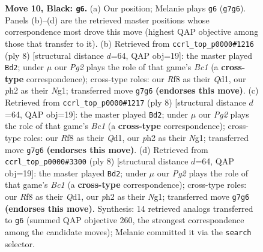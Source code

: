 \documentclass[11pt]{article}
\begin{document}
\begin{figure}[p]
\caption{\textbf{Move 10, Black: \texttt{g6}.} (a) Our position; Melanie plays \texttt{g6} (\texttt{g7g6}). Panels (b)--(d) are the retrieved master positions whose correspondence most drove this move (highest QAP objective among those that transfer to it). (b) Retrieved from \texttt{ccrl\_top\_p0000\#1216} (ply 8) [structural distance $d$=64, QAP obj=19]: the master played \texttt{Bd2}; under $\mu$ our \emph{Pg2} plays the role of that game's \emph{Bc1} (a \textbf{cross-type} correspondence); cross-type roles: our \emph{R}f8 as their \emph{Q}d1, our \emph{p}h2 as their \emph{N}g1; transferred move \texttt{g7g6} \textbf{(endorses this move)}. (c) Retrieved from \texttt{ccrl\_top\_p0000\#1217} (ply 8) [structural distance $d$=64, QAP obj=19]: the master played \texttt{Bd2}; under $\mu$ our \emph{Pg2} plays the role of that game's \emph{Bc1} (a \textbf{cross-type} correspondence); cross-type roles: our \emph{R}f8 as their \emph{Q}d1, our \emph{p}h2 as their \emph{N}g1; transferred move \texttt{g7g6} \textbf{(endorses this move)}. (d) Retrieved from \texttt{ccrl\_top\_p0000\#3300} (ply 8) [structural distance $d$=64, QAP obj=19]: the master played \texttt{Bd2}; under $\mu$ our \emph{Pg2} plays the role of that game's \emph{Bc1} (a \textbf{cross-type} correspondence); cross-type roles: our \emph{R}f8 as their \emph{Q}d1, our \emph{p}h2 as their \emph{N}g1; transferred move \texttt{g7g6} \textbf{(endorses this move)}. Synthesis: 14 retrieved analogs transferred to \texttt{g6} (summed QAP objective 260, the strongest correspondence among the candidate moves); Melanie committed it via the \texttt{search} selector.}
\label{fig:thought-m19}
\end{figure}

\clearpage
\end{document}
